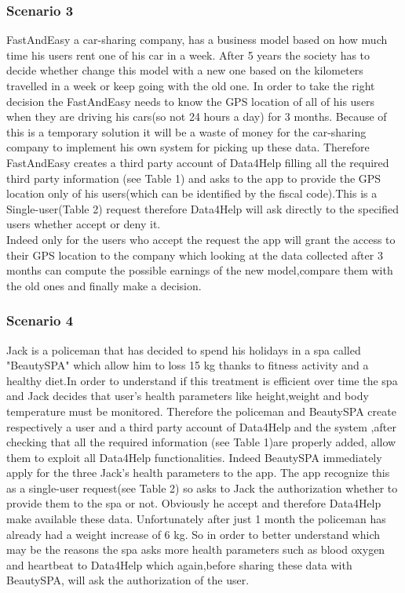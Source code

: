 \subsubsection{Scenario 3}
FastAndEasy a car-sharing company, has a business model based on how much time his users rent one of his car in a week. After 5 years the society has to decide whether change this model with a new one based on the kilometers travelled in a week or keep going with the old one. In order to take the right decision the FastAndEasy needs to know the  GPS location of all of his users when they are driving his cars(so not 24 hours a day) for 3 months. Because of this is a temporary solution it will be a waste of money for the car-sharing company to implement his own system for picking up these data. Therefore FastAndEasy creates a third party account of Data4Help filling all the required third party information (see Table 1) and asks to the app to provide the GPS location only of his users(which can be identified by the fiscal code).This is a Single-user(Table 2) request therefore  Data4Help will ask directly to the specified users whether accept or deny it.\\ Indeed only for the users who accept the request the app will grant the access to their GPS location to the company which  looking at the data collected after 3 months can compute the possible earnings of the new model,compare them with the old ones and finally make a decision.

\subsubsection{Scenario 4}
Jack is a policeman that has decided to spend his holidays in a spa called "BeautySPA" which allow him to loss 15 kg thanks to fitness activity and a healthy diet.In order to understand if this treatment is efficient over time the spa and Jack decides that user's health parameters like height,weight and body temperature must be monitored. Therefore the policeman and BeautySPA create respectively a user and a third party account of Data4Help and the system ,after checking that all the required information (see Table 1)are properly added, allow them to exploit all Data4Help functionalities. Indeed  BeautySPA immediately apply for the three Jack's health parameters to the app. The app recognize this as a single-user request(see Table 2)  so asks to Jack the authorization whether to provide them to the spa or not. Obviously he accept and therefore Data4Help make available these data. Unfortunately after just 1 month the policeman has already had a weight increase of 6 kg. So in order to better understand which may be the reasons the spa asks more health parameters such as blood oxygen and heartbeat to Data4Help which again,before sharing these data with BeautySPA, will ask the authorization of the user.

